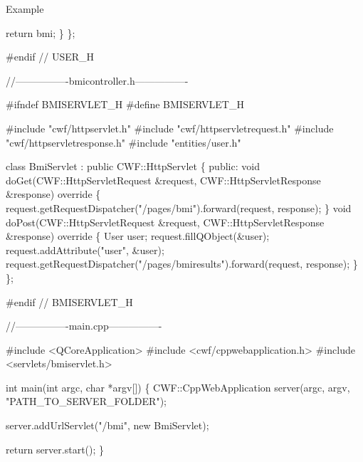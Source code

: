 \begin{DoxyParagraph}{Example}
\begin{DoxyCode}
        \textcolor{keywordflow}{return} bmi;
    \}
\};

\textcolor{preprocessor}{#endif // USER\_H}

\textcolor{comment}{//----------------bmicontroller.h----------------}

\textcolor{preprocessor}{#ifndef BMISERVLET\_H}
\textcolor{preprocessor}{#define BMISERVLET\_H}

\textcolor{preprocessor}{#include "cwf/httpservlet.h"}
\textcolor{preprocessor}{#include "cwf/httpservletrequest.h"}
\textcolor{preprocessor}{#include "cwf/httpservletresponse.h"}
\textcolor{preprocessor}{#include "entities/user.h"}

\textcolor{keyword}{class }BmiServlet : \textcolor{keyword}{public} CWF::HttpServlet
\{
\textcolor{keyword}{public}:
    \textcolor{keywordtype}{void} doGet(CWF::HttpServletRequest &request, CWF::HttpServletResponse &response)\textcolor{keyword}{ override}
\textcolor{keyword}{    }\{
        request.getRequestDispatcher(\textcolor{stringliteral}{"/pages/bmi"}).forward(request, response);
    \}
    \textcolor{keywordtype}{void} doPost(CWF::HttpServletRequest &request, CWF::HttpServletResponse &response)\textcolor{keyword}{ override}
\textcolor{keyword}{    }\{
        User user;
        request.fillQObject(&user);
        request.addAttribute(\textcolor{stringliteral}{"user"}, &user);
        request.getRequestDispatcher(\textcolor{stringliteral}{"/pages/bmiresults"}).forward(request, response);
    \}
\};

\textcolor{preprocessor}{#endif // BMISERVLET\_H}

\textcolor{comment}{//----------------main.cpp----------------}

\textcolor{preprocessor}{#include <QCoreApplication>}
\textcolor{preprocessor}{#include <cwf/cppwebapplication.h>}
\textcolor{preprocessor}{#include <servlets/bmiservlet.h>}

\textcolor{keywordtype}{int} main(\textcolor{keywordtype}{int} argc, \textcolor{keywordtype}{char} *argv[])
\{
    CWF::CppWebApplication server(argc, argv, \textcolor{stringliteral}{"PATH\_TO\_SERVER\_FOLDER"});

    server.addUrlServlet(\textcolor{stringliteral}{"/bmi"}, \textcolor{keyword}{new} BmiServlet);

    \textcolor{keywordflow}{return} server.start();
\}
\end{DoxyCode}
 
\end{DoxyParagraph}
\mbox{\label{class_http_servlet_request_a8c20ab8bd4ce24c33500b333b301e960}} 
